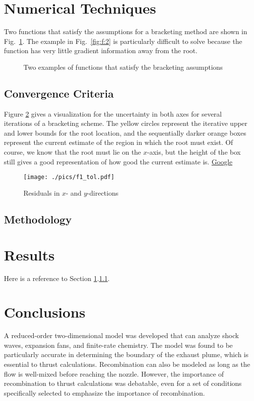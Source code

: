 \documentclass{../aiaa-pretty}
\begin{document}
\section{Numerical Techniques}  \label{sec:techniques}
Two functions that satisfy the assumptions for a bracketing method are shown in Fig.~\ref{fig:f:plain}.  The example in Fig.~\ref{fig:f:2} is particularly difficult to solve because the function has very little gradient information away from the root.

\begin{figure}
\centering
{}
\caption{ \label{fig:f:plain}
Two examples of functions that satisfy the bracketing assumptions}
\end{figure}


\subsection{Convergence Criteria} \label{ssec:criteria}
Figure \ref{fig:f:tol} gives a visualization for the uncertainty in both axes for several iterations of a bracketing scheme.  The yellow circles represent the iterative upper and lower bounds for the root location, and the sequentially darker orange boxes represent the current estimate of the region in which the root must exist.  Of course, we know that the root must lie on the $x$-axis, but the height of the box still gives a good representation of how good the current estimate is.  \href{http://www.google.com}{Google}

\begin{figure}
\centering
\texttt{[image: ./pics/f1\_tol.pdf]}
\caption{ \label{fig:f:tol}
Residuals in $x$- and $y$-directions}
\end{figure}


\subsection{Methodology}



\section{Results}
Here is a reference to Section \ref{sec:techniques}.\ref{ssec:criteria}.


\section{Conclusions}                            \label{sec:conclusion}
A reduced-order two-dimensional model was developed that can analyze shock waves, expansion fans, and finite-rate chemistry.  The model was found to be particularly accurate in determining the boundary of the exhaust plume, which is essential to thrust calculations.  Recombination can also be modeled as long as the flow is well-mixed before reaching the nozzle.  However, the importance of recombination to thrust calculations was debatable, even for a set of conditions specifically selected to emphasize the importance of recombination.
\end{document}
